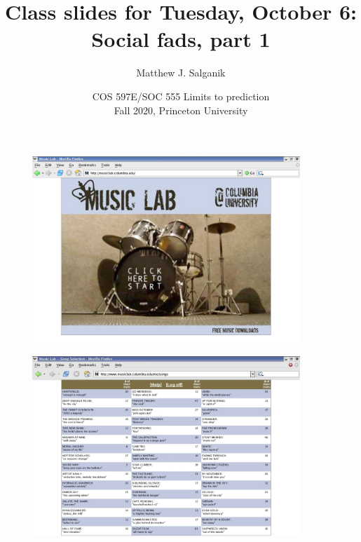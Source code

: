 \documentclass[aspectratio=169]{beamer}
\title[]{Class slides for Tuesday, October 6:\\Social fads, part 1}
\author[]{Matthew J. Salganik}
\institute[]{}
\date[]{COS 597E/SOC 555 Limits to prediction\\Fall 2020, Princeton University}
\begin{document}
\frame{\titlepage}
\begin{frame}

\begin{figure}
  \centering
  \includegraphics[width = 0.9\textwidth]{figures/splashscreen}
\end{figure}

\end{frame}
\begin{frame}

\begin{figure}
  \centering
  \includegraphics[width = 0.9\textwidth]{figures/info-v1-cut}
\end{figure}

\end{frame}
\end{document}
